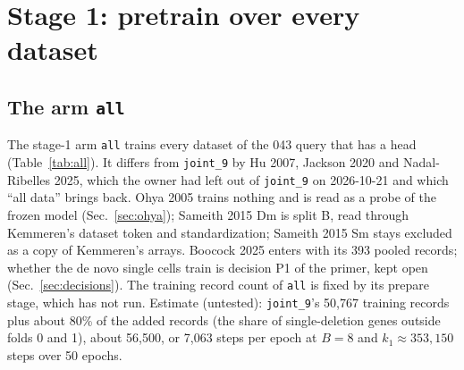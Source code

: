 
\section{Stage 1: pretrain over every dataset}
\label{sec:stage1}

\subsection{The arm \texttt{all}}
\label{sec:armall}

The stage-1 arm \texttt{all} trains every dataset of the 043 query that has a head
(Table~\ref{tab:all}). It differs from \texttt{joint\_9} by Hu 2007, Jackson 2020 and
Nadal-Ribelles 2025, which the owner had left out of \texttt{joint\_9} on 2026-10-21 and
which ``all data'' brings back. Ohya 2005 trains nothing and is read as a probe of the frozen
model (Sec.~\ref{sec:ohya}); Sameith 2015 Dm is split B, read through Kemmeren's dataset token
and standardization; Sameith 2015 Sm stays excluded as a copy of Kemmeren's arrays. Boocock
2025 enters with its 393 pooled records; whether the de novo single cells train is decision P1
of the primer, kept open (Sec.~\ref{sec:decisions}). The training record count of \texttt{all}
is fixed by its prepare stage, which has not run. Estimate (untested): \texttt{joint\_9}'s
50{,}767 training records plus about 80\% of the added records (the share of single-deletion
genes outside folds 0 and 1), about 56{,}500, or 7{,}063 steps per epoch at $B = 8$ and $k_1
\approx 353{,}150$ steps over 50 epochs.

